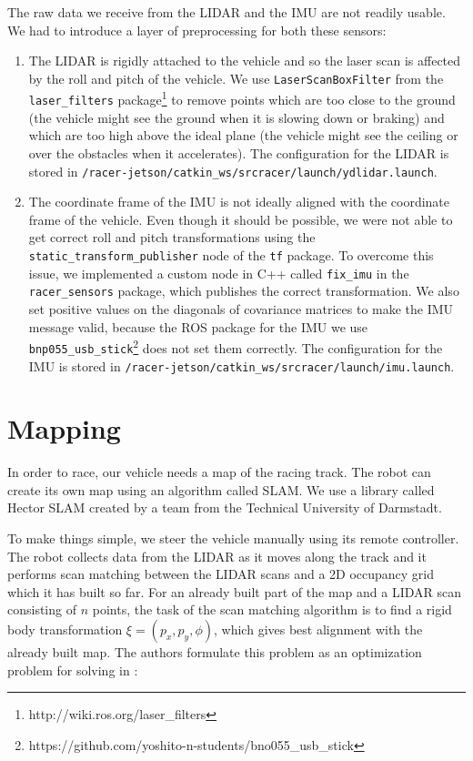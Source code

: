 The raw data we receive from the \gls*{LIDAR} and the \gls*{IMU} are not readily usable. We had to introduce a layer of preprocessing for both these sensors:

\begin{enumerate}
	\item The \gls*{LIDAR} is rigidly attached to the vehicle and so the laser scan is affected by the roll and pitch of the vehicle. We use \texttt{LaserScanBoxFilter} from the \texttt{laser\_filters} package\footnote{http://wiki.ros.org/laser\_filters} to remove points which are too close to the ground (the vehicle might see the ground when it is slowing down or braking) and which are too high above the ideal plane (the vehicle might see the ceiling or over the obstacles when it accelerates). The configuration for the \gls*{LIDAR} is stored in \texttt{/racer-jetson/\allowbreak catkin\_ws/\allowbreak src\allowbreak racer/\allowbreak launch/ydlidar.launch}.
	
	\item The coordinate frame of the \gls*{IMU} is not ideally aligned with the coordinate frame of the vehicle. Even though it should be possible, we were not able to get correct roll and pitch transformations using the \texttt{  static\_transform\_publisher} node of the \texttt{tf} package. To overcome this issue, we implemented a custom node in C++ called \verb|fix_imu| in the \verb|racer_sensors| package, which publishes the correct transformation. We also set positive values on the diagonals of covariance matrices to make the \gls*{IMU} message valid, because the \gls*{ROS} package for the IMU we use  \verb|bnp055_usb_stick|\footnote{https://github.com/yoshito-n-students/bno055\_usb\_stick} does not set them correctly. The configuration for the \gls*{IMU} is stored in \texttt{/racer-jetson/\allowbreak catkin\_ws/\allowbreak src\allowbreak racer/\allowbreak launch/imu.launch}.
\end{enumerate}

\section{Mapping}

In order to race, our vehicle needs a map of the racing track. The robot can create its own map using an algorithm called \gls{SLAM}. We use a library called Hector \gls*{SLAM} created by a team from the Technical University of Darmstadt.

To make things simple, we steer the vehicle manually using its remote controller. The robot collects data from the \gls*{LIDAR} as it moves along the track and it performs scan matching between the \gls*{LIDAR} scans and a 2D occupancy grid which it has built so far. For an already built part of the map and a \gls*{LIDAR} scan consisting of $n$ points, the task of the scan matching algorithm is to find a rigid body transformation $\xi =\left( p_x, p_y, \phi\right)$, which gives best alignment with the already built map. The authors formulate this problem as an optimization problem for solving in \cite{HectorSlam}:

